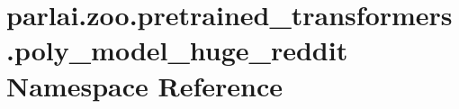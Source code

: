 \hypertarget{namespaceparlai_1_1zoo_1_1pretrained__transformers_1_1poly__model__huge__reddit}{}\section{parlai.\+zoo.\+pretrained\+\_\+transformers.\+poly\+\_\+model\+\_\+huge\+\_\+reddit Namespace Reference}
\label{namespaceparlai_1_1zoo_1_1pretrained__transformers_1_1poly__model__huge__reddit}
